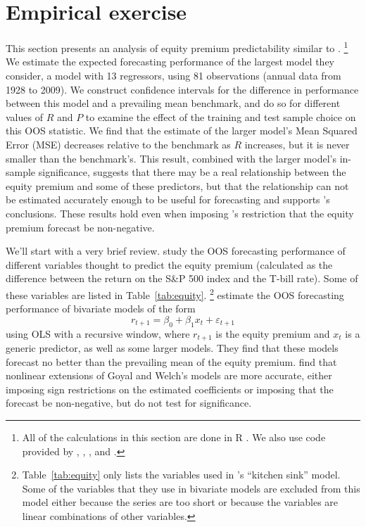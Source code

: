 \documentclass[11pt]{article}
\newcommand{\e}{\varepsilon}
\newcommand{\citepos}[1]{\citeauthor{#1}'s \citeyearpar{#1}}
\begin{document}
\section{Empirical exercise}\label{sec:empirics}
This section presents an analysis of equity premium predictability
similar to \citet{GoW:08}.%
\footnote{All of the calculations in this
  section are done in R \citep{Rde:10}.  We also use code provided by
  \citet{Zeh:02}, \citet{Zei:04}, \citet{Har:10}, and
  \citet{ShB:11:0.6.1}.} %
We estimate the expected forecasting
performance of the largest model they consider, a model with 13
regressors, using 81 observations (annual data from 1928 to 2009).  We
construct confidence intervals for the difference in performance
between this model and a prevailing mean benchmark, and do so for
different values of $R$ and $P$ to examine the effect of the training
and test sample choice on this OOS statistic.  We find that the
estimate of the larger model's Mean Squared Error (MSE) decreases relative to the
benchmark as $R$ increases, but it is never smaller than the
benchmark's.  This result, combined with the larger model's in-sample
significance, suggests that there may be a real relationship between
the equity premium and some of these predictors, but that the
relationship can not be estimated accurately enough to be useful for
forecasting and supports \citepos{GoW:08} conclusions.  These results
hold even when imposing \citepos{CaT:08} restriction that the equity
premium forecast be non-negative.

We'll start with a very brief review.  \citet{GoW:08}
study the OOS forecasting performance of different variables thought
to predict the equity premium (calculated as the difference between
the return on the S\&P 500 index and the T-bill rate).  Some of these
variables are listed in
Table~\ref{tab:equity}.%
\footnote{Table~\ref{tab:equity} only lists the
  variables used in \citepos{GoW:08} ``kitchen sink''
  model.  Some of the variables that they use in bivariate models are
  excluded from this model either because the series are too short or
  because the variables are linear combinations of other variables.} %
\citet{GoW:08} estimate the OOS forecasting
performance of bivariate models of the form
\[
r_{t+1} = \beta_0 + \beta_1 x_t + \e_{t+1}
\]
using OLS with a recursive window, where $r_{t+1}$ is the equity
premium and $x_t$ is a generic predictor, as well as some larger
models.  They find that these models forecast no better than the
prevailing mean of the equity premium.
\citet{CaT:08} find that nonlinear extensions of
Goyal and Welch's models are more accurate, either imposing sign
restrictions on the estimated coefficients or imposing that the
forecast be non-negative, but do not test for significance.
\end{document}
